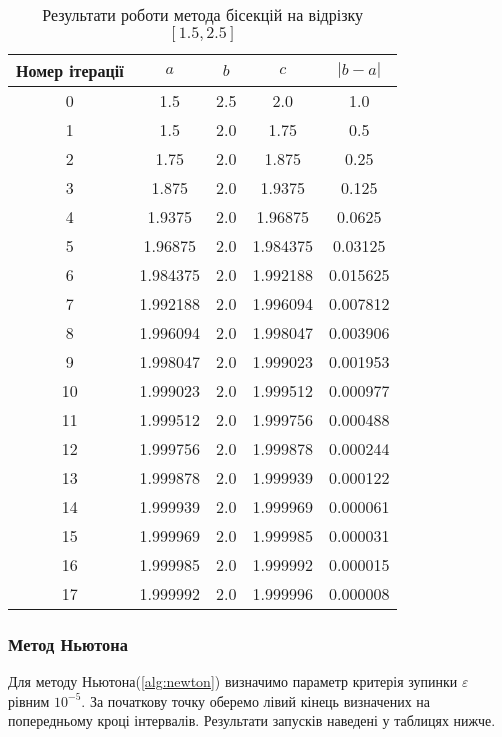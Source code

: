 \begin{table}[h!]
    \centering
    \begin{tabular}{|c|c|c|c|c|}
        \hline
        \textbf{Номер ітерації} & $a$ & $b$ & $c$ & $|b-a|$ \\
        \hline
        0 & 1.5 & 2.5 & 2.0 & 1.0 \\
        \hline
        1 & 1.5 & 2.0 & 1.75 & 0.5 \\
        \hline
        2 & 1.75 & 2.0 & 1.875 & 0.25 \\
        \hline
        3 & 1.875 & 2.0 & 1.9375 & 0.125 \\
        \hline
        4 & 1.9375 & 2.0 & 1.96875 & 0.0625 \\
        \hline
        5 & 1.96875 & 2.0 & 1.984375 & 0.03125 \\
        \hline
        6 & 1.984375 & 2.0 & 1.992188 & 0.015625 \\
        \hline
        7 & 1.992188 & 2.0 & 1.996094 & 0.007812 \\
        \hline
        8 & 1.996094 & 2.0 & 1.998047 & 0.003906 \\
        \hline
        9 & 1.998047 & 2.0 & 1.999023 & 0.001953 \\
        \hline
        10 & 1.999023 & 2.0 & 1.999512 & 0.000977 \\
        \hline
        11 & 1.999512 & 2.0 & 1.999756 & 0.000488 \\
        \hline
        12 & 1.999756 & 2.0 & 1.999878 & 0.000244 \\
        \hline
        13 & 1.999878 & 2.0 & 1.999939 & 0.000122 \\
        \hline
        14 & 1.999939 & 2.0 & 1.999969 & 0.000061 \\
        \hline
        15 & 1.999969 & 2.0 & 1.999985 & 0.000031 \\
        \hline
        16 & 1.999985 & 2.0 & 1.999992 & 0.000015 \\
        \hline
        17 & 1.999992 & 2.0 & 1.999996 & 0.000008 \\
        \hline
    \end{tabular}
    \caption{Результати роботи метода бісекцій на відрізку $[1.5, 2.5]$}
\end{table}

\clearpage
\subsubsection*{Метод Ньютона}
Для методу Ньютона(\ref{alg:newton}) визначимо параметр критерія зупинки
$\varepsilon$ рівним $10^{-5}$. За початкову точку оберемо
лівий кінець визначених на попередньому кроці інтервалів.
Результати запусків наведені у таблицях нижче.

